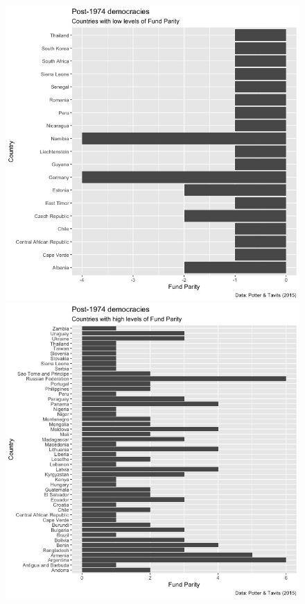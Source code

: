 \documentclass{beamer}
\begin{document}

\begin{frame}
	\frametitle{}
	\begin{figure}
		\begin{minipage}[b]{0.49\linewidth}
		\centering
		\includegraphics[width = \linewidth, height = .89\textheight]{Rplot04.jpeg}
	\end{minipage}
\begin{minipage}[b]{0.49\linewidth}
	\centering
	\includegraphics[width = \linewidth, height = .89\textheight]{Rplot03.jpeg}
\end{minipage}
\end{figure}
\end{frame}
\end{document}
